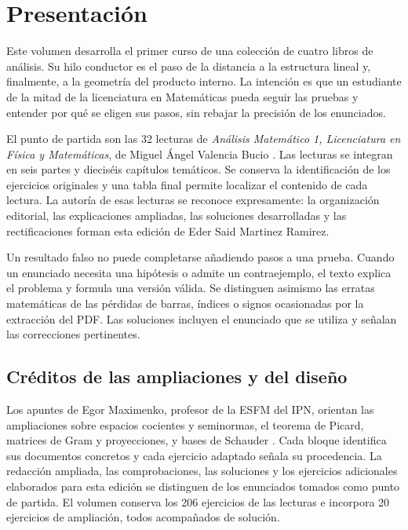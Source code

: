\chapter*{Presentación}
Este volumen desarrolla el primer curso de una colección de cuatro libros de análisis. Su hilo conductor es el paso de la distancia a la estructura lineal y, finalmente, a la geometría del producto interno. La intención es que un estudiante de la mitad de la licenciatura en Matemáticas pueda seguir las pruebas y entender por qué se eligen sus pasos, sin rebajar la precisión de los enunciados.

El punto de partida son las 32 lecturas de \emph{Análisis Matemático 1, Licenciatura en Física y Matemáticas}, de Miguel Ángel Valencia Bucio \cite{valencia}. Las lecturas se integran en seis partes y dieciséis capítulos temáticos. Se conserva la identificación de los ejercicios originales y una tabla final permite localizar el contenido de cada lectura. La autoría de esas lecturas se reconoce expresamente: la organización editorial, las explicaciones ampliadas, las soluciones desarrolladas y las rectificaciones forman esta edición de Eder Said Martinez Ramirez.

Un resultado falso no puede completarse añadiendo pasos a una prueba. Cuando un enunciado necesita una hipótesis o admite un contraejemplo, el texto explica el problema y formula una versión válida. Se distinguen asimismo las erratas matemáticas de las pérdidas de barras, índices o signos ocasionadas por la extracción del PDF. Las soluciones incluyen el enunciado que se utiliza y señalan las correcciones pertinentes.

\section*{Créditos de las ampliaciones y del diseño}
Los apuntes de Egor Maximenko, profesor de la ESFM del IPN, orientan las ampliaciones sobre espacios cocientes y seminormas, el teorema de Picard, matrices de Gram y proyecciones, y bases de Schauder \cite{max-cociente,max-seminormado,max-picard,max-gram,max-proyeccion,max-schauder}. Cada bloque identifica sus documentos concretos y cada ejercicio adaptado señala su procedencia. La redacción ampliada, las comprobaciones, las soluciones y los ejercicios adicionales elaborados para esta edición se distinguen de los enunciados tomados como punto de partida. El volumen conserva los 206 ejercicios de las lecturas e incorpora 20 ejercicios de ampliación, todos acompañados de solución.

